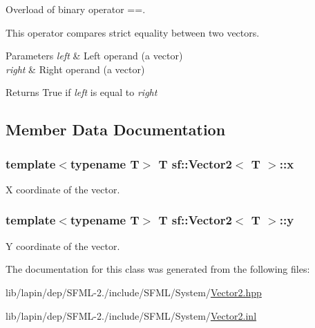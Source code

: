 Overload of binary operator ==. 

This operator compares strict equality between two vectors.


\begin{DoxyParams}{Parameters}
{\em left} & Left operand (a vector) \\
\hline
{\em right} & Right operand (a vector)\\
\hline
\end{DoxyParams}
\begin{DoxyReturn}{Returns}
True if {\itshape left} is equal to {\itshape right} 
\end{DoxyReturn}


\subsection{Member Data Documentation}
\hypertarget{classsf_1_1_vector2_a1e6ad77fa155f3753bfb92699bd28141}{
\subsubsection[{x}]{\setlength{\rightskip}{0pt plus 5cm}template$<$typename T$>$ {\bf T} {\bf sf\-::\-Vector2}$<$ {\bf T} $>$\-::x}}\label{classsf_1_1_vector2_a1e6ad77fa155f3753bfb92699bd28141}


X coordinate of the vector. 

\hypertarget{classsf_1_1_vector2_a420f2481b015f4eb929c75f2af564299}{
\subsubsection[{y}]{\setlength{\rightskip}{0pt plus 5cm}template$<$typename T$>$ {\bf T} {\bf sf\-::\-Vector2}$<$ {\bf T} $>$\-::y}}\label{classsf_1_1_vector2_a420f2481b015f4eb929c75f2af564299}


Y coordinate of the vector. 



The documentation for this class was generated from the following files\-:\begin{DoxyCompactItemize}
\item 
lib/lapin/dep/\-S\-F\-M\-L-\/2./include/\-S\-F\-M\-L/\-System/\hyperlink{lib_2lapin_2dep_2_s_f_m_l-2_83_2include_2_s_f_m_l_2_system_2_vector2_8hpp}{Vector2.\-hpp}\item 
lib/lapin/dep/\-S\-F\-M\-L-\/2./include/\-S\-F\-M\-L/\-System/\hyperlink{lapin_2dep_2_s_f_m_l-2_83_2include_2_s_f_m_l_2_system_2_vector2_8inl}{Vector2.\-inl}\end{DoxyCompactItemize}
